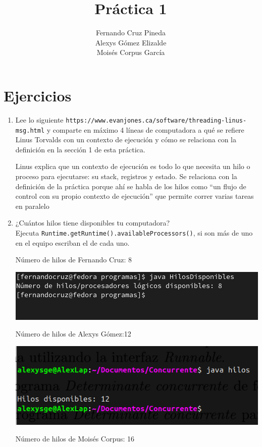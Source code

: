 \documentclass[12pt]{article}
\title{Práctica 1}
\author{Fernando Cruz Pineda \\ Alexys Gómez Elizalde \\ Moisés Corpus García}
\date{}
\begin{document}
\maketitle

\section*{Ejercicios}

\begin{enumerate}
    \item Lee lo siguiente \texttt{https://www.evanjones.ca/software/threading-linus-msg.html} y comparte en máximo 4 líneas de computadora a qué se refiere Linus Torvalds con un contexto de ejecución y cómo se relaciona con la definición en la sección 1 de esta práctica.

   Linus explica que un contexto de ejecución es todo lo que necesita un hilo o proceso para ejecutarse: su stack, registros y estado. Se relaciona con la definición de la práctica porque ahí se habla de los hilos como “un flujo de control con su propio contexto de ejecución” que permite correr varias tareas en paralelo
    
    \item ¿Cuántos hilos tiene disponibles tu computadora? \\
      Ejecuta \texttt{Runtime.getRuntime().availableProcessors()}, si son más de uno en el equipo escriban el de cada uno.

      Número de hilos de Fernando Cruz: 8

      \includegraphics[]{Fer.png}

      Número de hilos de Alexys Gómez:12

      \includegraphics[]{1Alexys.png}

      Número de hilos de Moisés Corpus: 16


\end{enumerate}
\end{document}
